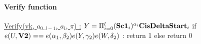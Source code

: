 \paragraph{Verify function} 
\underline{Verify(vk, $a_{0..l-1}$, $a_l$, $\pi$) :}
\tabNormal $Y=\Pi_{i=0}^{l}(\textbf{Sc1}_i)^{a_i} \textbf{CisDeltaStart}_i$
\tabNormal if $e(U, \textbf{V2}) == e(\textbf{$\alpha_1$}, \textbf{$\beta_2$}) e(Y, \textbf{$\gamma_2$}) e(W, \textbf{$\delta_2$}) $ :
\tabOne return 1
\tabNormal else 
\tabOne return 0